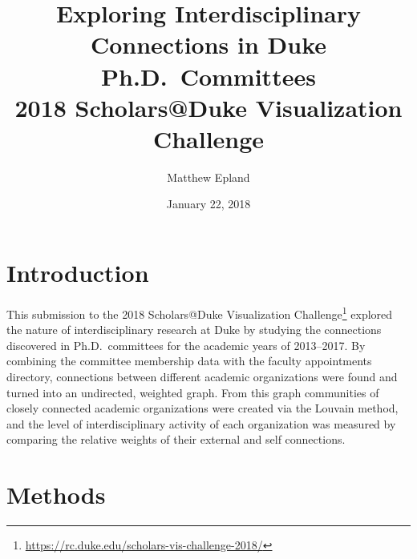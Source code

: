 \documentclass[notitlepage,aps,prd,nofootinbib]{revtex4-1}
\begin{document}
\title{Exploring Interdisciplinary Connections in Duke Ph.D.\ Committees\\2018 Scholars@Duke Visualization Challenge}
\author{Matthew\,\,Epland}
\date{January 22, 2018}


\maketitle

\section{Introduction}
This submission to the 2018 Scholars@Duke Visualization Challenge\footnote{\url{https://rc.duke.edu/scholars-vis-challenge-2018/}} explored the nature of interdisciplinary research at Duke by studying the connections discovered in Ph.D.\ committees for the academic years of 2013--2017. By combining the committee membership data with the faculty appointments directory, connections between different academic organizations were found and turned into an undirected, weighted graph. From this graph communities of closely connected academic organizations were created via the Louvain method, and the level of interdisciplinary activity of each organization was measured by comparing the relative weights of their external and self connections.


\section{Methods}
\end{document}
